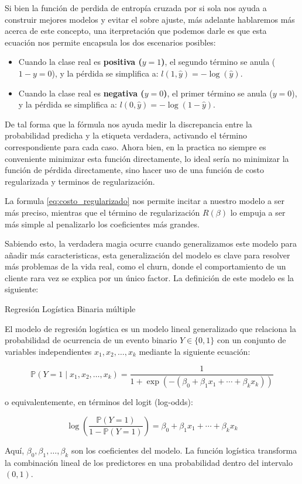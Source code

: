 Si bien la función de perdida de entropía cruzada por si sola nos ayuda a construir mejores modelos y evitar el sobre ajuste, más adelante hablaremos más acerca de este concepto, una iterpretación que podemos darle es que esta ecuación nos permite encapsula los dos escenarios posibles:
\begin{itemize}
	\item Cuando la clase real es \textbf{positiva ($y=1$)}, el segundo término se anula ($1-y=0$), y la pérdida se simplifica a: $l(1, \hat{y}) = -\log(\hat{y})$.
	\item Cuando la clase real es \textbf{negativa ($y=0$)}, el primer término se anula ($y=0$), y la pérdida se simplifica a: $l(0, \hat{y}) = -\log(1-\hat{y})$.
\end{itemize}

De tal forma que la fórmula nos ayuda medir la discrepancia entre la probabilidad predicha y la etiqueta verdadera, activando el término correspondiente para cada caso. Ahora bien, en la practica no siempre es conveniente minimizar esta función directamente, lo ideal sería no minimizar la función de pérdida directamente, sino hacer uso de una función de costo regularizada y terminos de regularización. 

La formula \eqref{eq:costo_regularizado} nos permite incitar a nuestro modelo a ser más preciso, mientras que el término de regularización $R(\beta)$ lo empuja a ser más simple al penalizarlo los coeficientes más grandes.

Sabiendo esto, la verdadera magia ocurre cuando generalizamos este modelo para añadir más caracteristicas, esta generalización del modelo es clave para resolver más problemas de la vida real, como el churn, donde el comportamiento de un cliente rara vez se explica por un único factor. La definición de este modelo es la siguiente:

\begin{definicion}{Regresión Logística Binaria múltiple}
	
	El modelo de regresión logística es un modelo lineal generalizado que relaciona la probabilidad de ocurrencia de un evento binario \( Y \in \{0, 1\} \) con un conjunto de variables independientes \( x_1, x_2, \ldots, x_k \) mediante la siguiente ecuación:
	
	\[
	\mathbb{P}(Y = 1 \mid x_1, x_2, \ldots, x_k) = \frac{1}{1 + \exp\left( - (\beta_0 + \beta_1 x_1 + \cdots + \beta_k x_k) \right)}
	\]
	
	o equivalentemente, en términos del logit (log-odds):
	
	\[
	\log\left( \frac{\mathbb{P}(Y = 1)}{1 - \mathbb{P}(Y = 1)} \right) = \beta_0 + \beta_1 x_1 + \cdots + \beta_k x_k
	\]
	
	Aquí, \( \beta_0, \beta_1, \ldots, \beta_k \) son los coeficientes del modelo. La función logística transforma la combinación lineal de los predictores en una probabilidad dentro del intervalo \( (0, 1) \).
	
\end{definicion}


